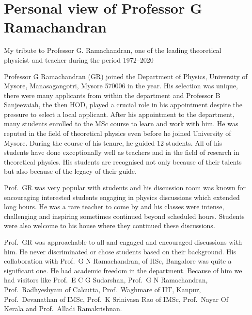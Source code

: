 \chapter{Personal view of Professor G Ramachandran}\label{chap19}



My tribute to Professor G. Ramachandran, one of the leading theoretical physicist and teacher during the period 1972--2020
\medskip

Professor G Ramachandran (GR) joined the Department of Physics, University of Mysore, Manasagangotri, Mysore
570006 in the year. His selection was unique, there were many applicants from within the department
and Professor B Sanjeevaiah, the then HOD, played a crucial role in his appointment despite the pressure to
select a local applicant. After his appointment to the department, many students enrolled to the MSc course to
learn and work with him. He was reputed in the field of theoretical physics even before he joined University of
Mysore. During the course of his tenure, he guided 12 students. All of his students have done exceptionally well
as teachers and in the field of research in theoretical physics. His students are recognised not only because of
their talents but also because of the legacy of their guide.

Prof.\ GR was very popular with students and his discussion room was known for encouraging interested students
engaging in physics discussions which extended long hours. He was a rare teacher to come by and his classes were
intense, challenging and inspiring sometimes continued beyond scheduled hours. Students were also welcome to
his house where they continued these discussions.

Prof.\ GR was approachable to all and engaged and encouraged discussions with him. He never discriminated
or chose students based on their background. His collaboration with Prof.\ G N Ramachandran, of IISc, Bangalore was quite a significant one. He had academic freedom in the department. Because of him we had visitors like Prof.\ E C G Sudarshan, Prof.\ G N Ramachandran, Prof.\ Radhyeshyam of Calcutta, Prof.\ Waghmare of IIT,
Kanpur, Prof.\ Devanathan of IMSc, Prof.\ K Srinivasa Rao of IMSc, Prof.\ Nayar Of Kerala and Prof.\ Alladi Ramakrishnan.

